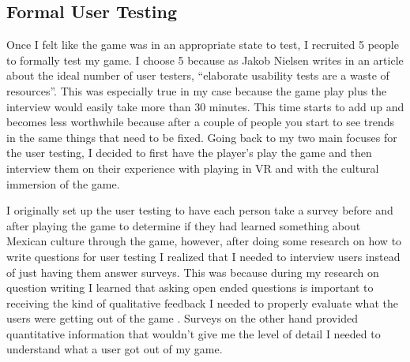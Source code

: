 \documentclass[10pt,twocolumn]{article}
\begin{document}
\subsection{Formal User Testing}
Once I felt like the game was in an appropriate state to test, I recruited 5 people to formally test my game. I choose 5 because as Jakob Nielsen writes in an article about the ideal number of user testers, “elaborate usability tests are a waste of resources”\cite{5tester2000}. This was especially true in my case because the game play plus the interview would easily take more than 30 minutes. This time starts to add up and becomes less worthwhile because after a couple of people you start to see trends in the same things that need to be fixed. Going back to my two main focuses for the user testing, I decided to first have the player’s play the game and then interview them on their experience with playing in VR and with the cultural immersion of the game. \par
I originally set up the user testing to have each person take a survey before and after playing the game to determine if they had learned something about Mexican culture through the game, however, after doing some research on how to write questions for user testing I realized that I needed to interview users instead of just having them answer surveys. This was because during my research on question writing I learned that asking open ended questions is important to receiving the kind of qualitative feedback I needed to properly evaluate what the users were getting out of the game \cite{testQues2021}. Surveys on the other hand provided quantitative information that wouldn’t give me the level of detail I needed to understand what a user got out of my game.
\end{document}
